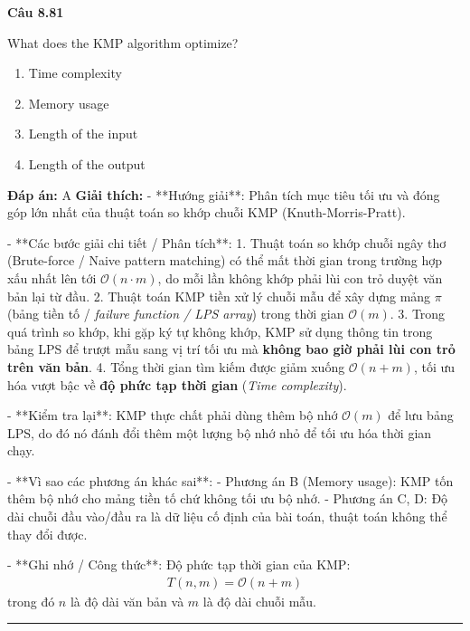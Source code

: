 \documentclass[11pt,a4paper]{article}
\newenvironment{question}[1]{%
  \par\vspace{1em}\noindent\textbf{\large Câu #1}\par\vspace{0.4em}
}{%
  \par\vspace{1em}\hrule\vspace{0.6em}
}
\newenvironment{choices}{%
  \begin{enumerate}[label=\textbf{\Alph*.},leftmargin=2.2em,itemsep=2pt,topsep=3pt]
}{%
  \end{enumerate}
}
\newcommand{\choice}{\item}
\begin{document}
\begin{question}{8.81}
What does the KMP algorithm optimize?
\begin{choices}
\choice Time complexity
\choice Memory usage
\choice Length of the input
\choice Length of the output
\end{choices}
\textbf{Đáp án:} A
\textbf{Giải thích:} - **Hướng giải**:
Phân tích mục tiêu tối ưu và đóng góp lớn nhất của thuật toán so khớp chuỗi KMP (Knuth-Morris-Pratt).


- **Các bước giải chi tiết / Phân tích**:
1. Thuật toán so khớp chuỗi ngây thơ (Brute-force / Naive pattern matching) có thể mất thời gian trong trường hợp xấu nhất lên tới \(\mathcal{O}(n \cdot m)\), do mỗi lần không khớp phải lùi con trỏ duyệt văn bản lại từ đầu.
2. Thuật toán KMP tiền xử lý chuỗi mẫu để xây dựng mảng \(\pi\) (bảng tiền tố / \textit{failure function / LPS array}) trong thời gian \(\mathcal{O}(m)\).
3. Trong quá trình so khớp, khi gặp ký tự không khớp, KMP sử dụng thông tin trong bảng LPS để trượt mẫu sang vị trí tối ưu mà \textbf{không bao giờ phải lùi con trỏ trên văn bản}.
4. Tổng thời gian tìm kiếm được giảm xuống \(\mathcal{O}(n + m)\), tối ưu hóa vượt bậc về \textbf{độ phức tạp thời gian} (\textit{Time complexity}).


- **Kiểm tra lại**:
KMP thực chất phải dùng thêm bộ nhớ \(\mathcal{O}(m)\) để lưu bảng LPS, do đó nó đánh đổi thêm một lượng bộ nhớ nhỏ để tối ưu hóa thời gian chạy.


- **Vì sao các phương án khác sai**:
- Phương án B (Memory usage): KMP tốn thêm bộ nhớ cho mảng tiền tố chứ không tối ưu bộ nhớ.
- Phương án C, D: Độ dài chuỗi đầu vào/đầu ra là dữ liệu cố định của bài toán, thuật toán không thể thay đổi được.


- **Ghi nhớ / Công thức**:
Độ phức tạp thời gian của KMP:
\[\begin{aligned}
T(n, m) = \mathcal{O}(n + m)
\end{aligned}\]
trong đó \(n\) là độ dài văn bản và \(m\) là độ dài chuỗi mẫu.
\end{question}
\end{document}
